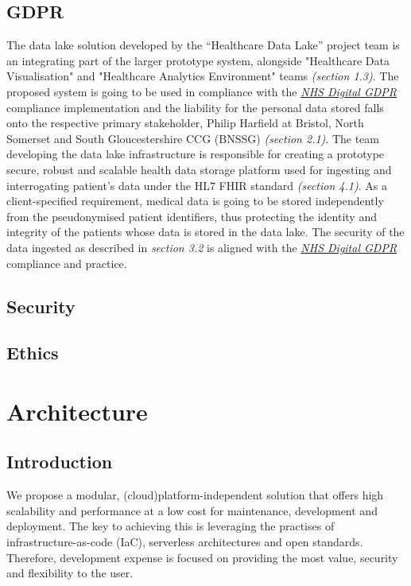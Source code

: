 \documentclass[10pt]{article}
\begin{document}
\subsection{GDPR}
The data lake solution developed by the “Healthcare Data Lake” project team is an integrating part of the larger prototype system, alongside "Healthcare Data Visualisation" and "Healthcare Analytics Environment" teams \emph{(section 1.3)}. The proposed system is going to be used in compliance with the \href{https://digital.nhs.uk/about-nhs-digital/our-work/keeping-patient-data-safe/gdpr}{\emph{NHS Digital GDPR}} compliance implementation and the liability for the personal data stored falls onto the respective primary stakeholder, Philip Harfield at Bristol, North Somerset and South Gloucestershire CCG (BNSSG) \emph{(section 2.1)}. The team developing the data lake infrastructure is responsible for creating a prototype secure, robust and scalable health data storage platform used for ingesting and interrogating patient’s data under the HL7 FHIR standard \emph{(section 4.1)}. As a client-specified requirement, medical data is going to be stored independently from the pseudonymised patient identifiers, thus protecting the identity and integrity of the patients whose data is stored in the data lake. The security of the data ingested as described in \emph {section 3.2} is aligned with the \href{https://digital.nhs.uk/about-nhs-digital/our-work/keeping-patient-data-safe/gdpr}{\emph{NHS Digital GDPR}} compliance and practice.
\subsection{Security}
\subsection{Ethics}

\newpage
\section{Architecture}
\subsection{Introduction}
We propose a modular, (cloud)platform-independent solution that offers high scalability and performance at a low cost for maintenance, development and deployment. The key to achieving this is leveraging the practises of infrastructure-as-code (IaC), serverless architectures and open standards. Therefore, development expense is focused on providing the most value, security and flexibility to the user.\\
\end{document}
